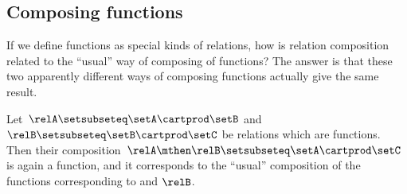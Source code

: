 \subsection{Composing functions}

If we define functions as special kinds of relations, how is relation composition related to the ``usual'' way of composing of functions?
The answer is that these two apparently different ways of composing functions actually give the same result.

\begin{lemma}
    \label{lem:comprelfun}
    Let~$\relA \setsubseteq \setA \cartprod \setB$ and~$\relB \setsubseteq \setB \cartprod \setC$ be relations which are functions.
    Then their composition~$\relA \mthen \relB \setsubseteq \setA \cartprod \setC$ is again a function, and it corresponds to the ``usual'' composition of the functions corresponding to \relA and $\relB$.
\end{lemma}

